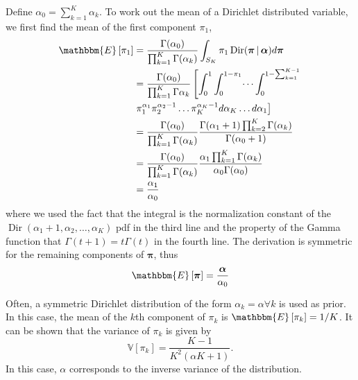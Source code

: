\documentclass[final,3p,times,twocolumn]{elsarticle}
\DeclareMathOperator*{\Dir}{Dir}
\let\bs\boldsymbol
\begin{document}
Define $\alpha_0 = \sum_{k=1}^K \alpha_k$. To work out the mean of a Dirichlet distributed variable, we first find the mean of the first component $\pi_1$,
\begin{equation}
\label{eqn:dirmean1}
\begin{split}
\mathbbm{E}\left[\pi_1\right] &= \frac{\Gamma(\alpha_0)}{\prod_{k=1}^K\Gamma(\alpha_k)} \int\nolimits_{S_K} \pi_1 \Dir(\bs \pi \,|\, \bs \alpha)d\bs\pi \\
&= \frac{\Gamma(\alpha_0)}{\prod_{k=1}^K\Gamma{\alpha_k}} \left[\int_0^1\int_0^{1-\pi_1}\dots\int_0^{1-\sum_{k=1}^{K-1}} \right.\\
& \left.\pi_1^{\alpha_1}\pi_2^{\alpha_2-1}\dots\pi_K^{\alpha_K-1}d\alpha_K \dots d\alpha_1\right]\\
&= \frac{\Gamma(\alpha_0)}{\prod_{k=1}^K\Gamma(\alpha_k)} \frac{\Gamma(\alpha_1+1)\prod_{k=2}^K\Gamma(\alpha_k)}{\Gamma(\alpha_0+1)}\\
&= \frac{\Gamma(\alpha_0)}{\prod_{k=1}^K\Gamma(\alpha_k)} \frac{\alpha_1\prod_{k=1}^K\Gamma(\alpha_k)}{\alpha_0 \Gamma(\alpha_0)}\\
&= \frac{\alpha_1}{\alpha_0}
\end{split}
\end{equation}
where we used the fact that the integral is the normalization constant of the $\Dir(\alpha_1+1,\alpha_2,\dots,\alpha_K)$ pdf in the third line and the property of the Gamma function that $\Gamma(t+1)=t\Gamma(t)$ in the fourth line. 
The derivation is symmetric for the remaining components of $\bs \pi$, thus 
\begin{equation}
\label{eqn:dirmean}
\mathbbm{E}\left[\bs \pi \right] = \frac{\bs \alpha}{\alpha_0}
\end{equation}

Often, a symmetric Dirichlet distribution of the form $\alpha_k = \alpha \forall k$ is used as prior.
In this case, the mean of the $k$th component of $\pi_k$ is $\mathbbm{E}\left[\pi_k\right] = 1/K$.
It can be shown that the variance of $\pi_k$ is given by
\begin{equation}
\label{eqn:dirvar}
\mathbb{V}\left[\pi_k\right] = \frac{K-1}{K^2(\alpha K + 1)}.
\end{equation}
In this case, $\alpha$ corresponds to the inverse variance of the distribution.
\end{document}
